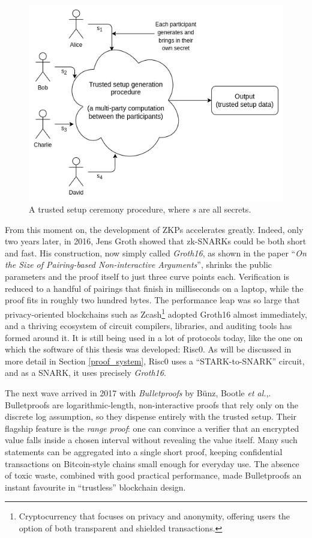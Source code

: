 \begin{figure}[h]
    \centering
    \includegraphics[width=0.9\linewidth]{Images/Chap1/trusted_setup.png}
    \caption{A trusted setup ceremony procedure, where \textit{s} are all secrets.\cite{vitalikblogTrustedSetup}}
    \label{fig:trustedSetup}
\end{figure}

From this moment on, the development of ZKPs accelerates greatly. Indeed, only two years later, in 2016, Jens Groth showed that zk-SNARKs could be both short and fast.
His construction, now simply called \textit{Groth16}, as shown in the paper “\textit{On the Size of Pairing-based Non-interactive Arguments}”\cite{groth16}, shrinks the public parameters and the proof itself to just three curve points each.
Verification is reduced to a handful of pairings that finish in milliseconds on a laptop, while the proof fits in roughly two hundred bytes. The performance leap was so large that privacy-oriented blockchains such as Zcash\footnote{Cryptocurrency that focuses on privacy and anonymity, offering users the option of both transparent and shielded transactions.} adopted Groth16 almost immediately, and a thriving ecosystem of circuit compilers, libraries, and auditing tools has formed around it. It is still being used in a lot of protocols today, like the one on which the software of this thesis was developed: Risc0. 
As will be discussed in more detail in Section \ref{proof_system}, Risc0 uses a “STARK-to-SNARK” circuit, and as a SNARK, it uses precisely \textit{Groth16}.



The next wave arrived in 2017 with \textit{Bulletproofs} by Bünz, Bootle \textit{et al.},\cite{bulletproof}.
Bulletproofs are logarithmic-length, non-interactive proofs that rely only on the discrete log assumption, so they dispense entirely with the trusted setup.
Their flagship feature is the \textit{range proof}: one can convince a verifier that an encrypted value falls inside a chosen interval without revealing the value itself.
Many such statements can be aggregated into a single short proof, keeping confidential transactions on Bitcoin-style chains small enough for everyday use.
The absence of toxic waste, combined with good practical performance, made Bulletproofs an instant favourite in “trustless” blockchain design.

